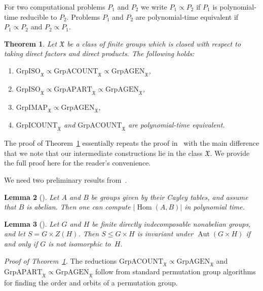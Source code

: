 \documentclass{article}
\newtheorem{theorem}{Theorem}[section]
\newtheorem{lemma}[theorem]{Lemma}
\DeclareMathOperator{\Aut}{Aut}
\DeclareMathOperator{\Hom}{Hom}
\newcommand{\X}{\mathfrak{X}}
\begin{document}
For two computational problems \( P_1 \) and \( P_2 \) we write \( P_1 \propto P_2 \) if \( P_1 \) is polynomial-time reducible to \( P_2 \).
Problems \( P_1 \) and \( P_2 \) are polynomial-time equivalent if \( P_1 \propto P_2 \) and \( P_2 \propto P_1 \).

\begin{theorem}\label{treduct}
	Let \( \X \) be a class of finite groups which is closed with respect to taking direct factors and direct products.
	The following holds:
	\begin{enumerate}[\rm(i)]
		\item \( \mathrm{GrpISO}_\X \propto \mathrm{GrpACOUNT}_\X \propto \mathrm{GrpAGEN}_\X \),
		\item \( \mathrm{GrpISO}_\X \propto \mathrm{GrpAPART}_\X \propto \mathrm{GrpAGEN}_\X \),
		\item \( \mathrm{GrpIMAP}_\X \propto \mathrm{GrpAGEN}_\X \),
		\item \( \mathrm{GrpICOUNT}_\X \) and \( \mathrm{GrpACOUNT}_\X \) are polynomial-time equivalent.
	\end{enumerate}
\end{theorem}

The proof of Theorem~\ref{treduct} essentially repeats the proof in~\cite{grpreduct} with the main difference
that we note that our intermediate constructions lie in the class \( \X \). We provide the full proof here for the reader's convenience.

We need two preliminary results from~\cite{grpreduct}.

\begin{lemma}[{\cite[Lemma~3.1]{grpreduct}}]\label{lcounthom}
	Let \( A \) and \( B \) be groups given by their Cayley tables, and assume that \( B \) is abelian.
	Then one can compute \( |\Hom(A, B)| \) in polynomial time.
\end{lemma}

\begin{lemma}[{\cite[Lemma~3.2]{grpreduct}}]\label{linvar}
	Let \( G \) and \( H \) be finite directly indecomposable nonabelian groups, and let \( S = G \times Z(H) \).
	Then \( S \leq G \times H \) is invariant under \( \Aut(G \times H) \) if and only if \( G \) is not isomorphic to~\( H \).
\end{lemma}

\noindent
\emph{Proof of Theorem~\ref{treduct}.}
The reductions \( \mathrm{GrpACOUNT}_\X \propto \mathrm{GrpAGEN}_\X \) and \( \mathrm{GrpAPART}_\X \propto \mathrm{GrpAGEN}_\X \)
follow from standard permutation group algorithms for finding the order and orbits of a permutation group.
\end{document}
